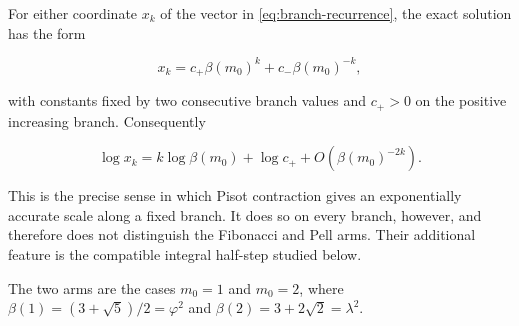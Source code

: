\begin{remark}
\label{rem:pisot-branch-scale}
For either coordinate $x_k$ of the vector in
\cref{eq:branch-recurrence}, the exact solution has the form

\begin{equation}
 x_k=c_+\beta(m_0)^k+c_-\beta(m_0)^{-k},
 \label{eq:branch-binet}
\end{equation}

with constants fixed by two consecutive branch values and $c_+>0$ on the
positive increasing branch. Consequently

\begin{equation}
 \log x_k=k\log\beta(m_0)+\log c_+
 +O\!\left(\beta(m_0)^{-2k}\right).
 \label{eq:branch-log-scale}
\end{equation}

This is the precise sense in which Pisot contraction gives an exponentially
accurate scale along a fixed branch. It does so on every branch, however, and
therefore does not distinguish the Fibonacci and Pell arms. Their additional
feature is the compatible integral half-step studied below.
\end{remark}

The two arms are the cases $m_0=1$ and $m_0=2$, where
$\beta(1)=(3+\sqrt5)/2=\varphi^2$ and
$\beta(2)=3+2\sqrt2=\lambda^2$.

